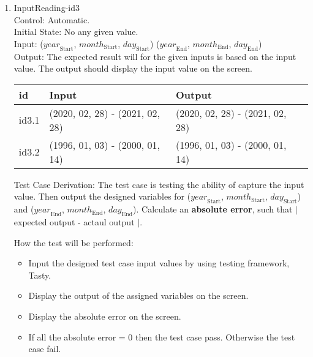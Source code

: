 \documentclass[12pt, titlepage]{article}
\begin{document}
\begin{enumerate}
\item{InputReading-id3\\}
Control: Automatic.\\
 
Initial State: No any given value.\\
Input: ($\mathit{year}_\text{Start}$, $\mathit{month}_\text{Start}$, $\mathit{day}_\text{Start}$)  ($\mathit{year}_\text{End}$, $\mathit{month}_\text{End}$, $\mathit{day}_\text{End}$)\\ 


Output: The expected result will for the given inputs is based on the input value.
The output should display the input value on the screen.

\noindent \begin{tabular}{l l l l} 
    \toprule		
    \textbf{id} & \textbf{Input} & \textbf{Output}\\ 
	\midrule
   id3.1 & (2020, 02, 28) - (2021, 02, 28) & (2020, 02, 28) - (2021, 02, 28)\\
   id3.2 & (1996, 01, 03) - (2000, 01, 14)  & (1996, 01, 03) - (2000, 01, 14) \\
    \bottomrule
  \end{tabular}


Test Case Derivation: The test case is testing the ability of capture the input value. Then output the designed variables for  ($\mathit{year}_\text{Start}$, $\mathit{month}_\text{Start}$, $\mathit{day}_\text{Start}$) and ($\mathit{year}_\text{End}$, $\mathit{month}_\text{End}$, $\mathit{day}_\text{End}$). Calculate an \textbf{absolute error}, such that $|$ expected output - actaul output $|$.


How the test will be performed:

\begin{itemize} 
\item Input the designed test case input values by using testing framework, Tasty. 
\item Display the output of the assigned variables on the screen.
\item  Display the absolute error on the screen.
\item  If all the absolute error = 0 then the test case pass. Otherwise the test case fail.
\end{itemize}

\end{enumerate}
\end{document}
